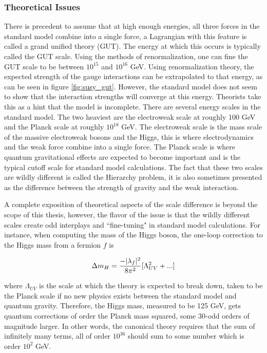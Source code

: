   \subsubsection{Theoretical Issues}
    \begin{enumerate}
       There is precedent to assume that at high enough energies, all three forces in the standard model combine into a single force, a Lagrangian with this feature is called a grand unified theory (GUT). The energy at which this occurs is typically called the GUT scale. Using the methods of renormalization, one can fine the GUT scale to be between $10^{15}$ and $10^{16}$ GeV. Using renormalization theory, the expected strength of the gauge interactions can be extrapolated to that energy, as can be seen in figure \ref{fig:susy_gut}. However, the standard model does not seem to show that the interaction strengths will converge at this energy. Theorists take this as a hint that the model is incomplete.
       There are several energy scales in the standard model. The two heaviest are the electroweak scale at roughly 100 GeV and the Planck scale at roughly $10^{18}$ GeV. The electroweak scale is the mass scale of the massive electroweak bosons and the Higgs, this is where electrodynamics and the weak force combine into a single force. The Planck scale is where quantum gravitational effects are expected to become important and is the typical cutoff scale for standard model calculations. The fact that these two scales are wildly different is called the Hierarchy problem, it is also sometimes presented as the difference between the strength of gravity and the weak interaction.

      A complete exposition of theoretical aspects of the scale difference is beyond the scope of this thesis, however, the flavor of the issue is that the wildly different scales create odd interplays and ``fine-tuning" in standard model calculations. For instance, when computing the mass of the Higgs boson, the one-loop correction to the Higgs mass from a fermion $f$ is

      \[
        \Delta m_H = \frac{-\lvert \lambda_f \rvert^2}{8 \pi^2} [\Lambda_{UV}^2 + ...]
      \]

      where $\Lambda_{UV}$ is the scale at which the theory is expected to break down, taken to be the Planck scale if no new physics exists between the standard model and quantum gravity. Therefore, the Higgs mass, measured to be 125 GeV, gets quantum corrections of order the Planck mass squared, some 30-odd orders of magnitude larger. In other words, the canonical theory requires that the sum of infinitely many terms, all of order $10^{36}$ should sum to some number which is order $10^2$ GeV.


\end{enumerate}
